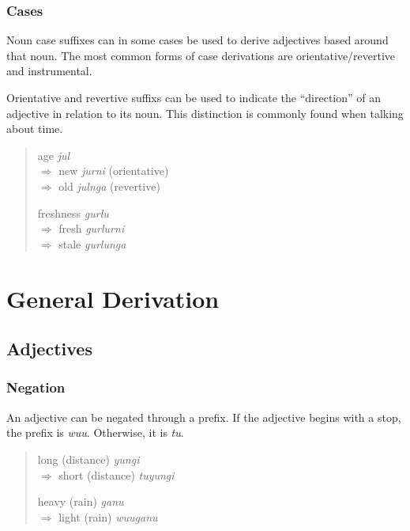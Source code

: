 \subsubsection{Cases}

Noun case suffixes can in some cases be used to derive adjectives based around
that noun. The most common forms of case derivations are orientative/revertive
and instrumental.

Orientative and revertive suffixs can be used to indicate the ``direction'' of
an adjective in relation to its noun. This distinction is commonly found when
talking about time.

\begin{quote}
\begin{multicols}{2}
age \textit{jul}\\
$\Rightarrow$ new \textit{jurni} (orientative)\\
$\Rightarrow$ old \textit{julnga} (revertive)

freshness \textit{gurlu}\\
$\Rightarrow$ fresh \textit{gurlurni}\\
$\Rightarrow$ stale \textit{gurlunga}
\end{multicols}
\end{quote}

\section{General Derivation}

\subsection{Adjectives}

\subsubsection{Negation}

An adjective can be negated through a prefix. If the adjective begins with a
stop, the prefix is \textit{wuu}. Otherwise, it is \textit{tu}.

\begin{quote}
\begin{multicols}{2}
long (distance) \textit{yungi}\\
$\Rightarrow$ short (distance) \textit{tuyungi}

heavy (rain) \textit{ganu}\\
$\Rightarrow$ light (rain) \textit{wuuganu}
\end{multicols}
\end{quote}

